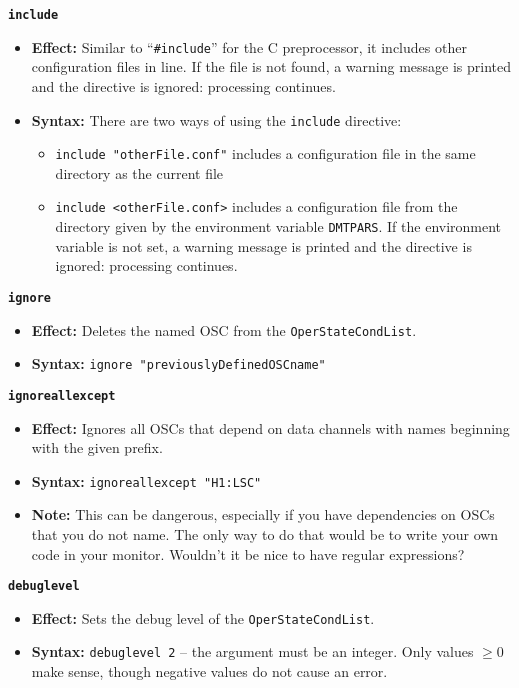 \documentclass[11pt]{article}
\begin{document}
{\large\texttt{\textbf{include}}}
\begin{itemize}
\item \textbf{Effect:} Similar to ``\texttt{\#include}'' for the C
  preprocessor, it includes other configuration files in line. If the
  file is not found, a warning message is printed and the directive is
  ignored:  processing continues.
\item \textbf{Syntax:} There are two ways of using the
  \texttt{include} directive:
  \begin{itemize}
  \item \texttt{include "otherFile.conf"} includes a configuration
    file in the same directory as the current file
  \item \texttt{include <otherFile.conf>} includes a configuration
    file from the directory given by the environment variable
    \texttt{DMTPARS}.  If the environment variable is not set, 
    a warning message is printed and the directive is ignored:
    processing continues.
  \end{itemize}
\end{itemize}

{\large\texttt{\textbf{ignore}}}
\begin{itemize}
\item \textbf{Effect:} Deletes the named OSC from the
  \texttt{OperStateCondList}.
\item \textbf{Syntax:} \texttt{ignore "previouslyDefinedOSCname"}
\end{itemize}

{\large\texttt{\textbf{ignoreallexcept}}}
\begin{itemize}
\item \textbf{Effect:} Ignores all OSCs that depend on data channels
  with names beginning with the given prefix.
\item \textbf{Syntax:} \texttt{ignoreallexcept "H1:LSC"}
\item \textbf{Note:} This can be dangerous, especially if you have
  dependencies on OSCs that you do not name.  The only way to do that 
  would be to write your own code in your monitor.  Wouldn't it be
  nice to have regular expressions? 
\end{itemize}

{\large\texttt{\textbf{debuglevel}}}
\begin{itemize}
\item \textbf{Effect:} Sets the debug level of the
  \texttt{OperStateCondList}.
\item \textbf{Syntax:} \texttt{debuglevel 2} -- the argument must be an
  integer. Only values $\geq 0$ make sense, though negative values do not
  cause an error.
\end{itemize}
\end{document}
